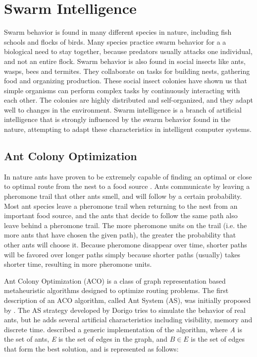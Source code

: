 \section{Swarm Intelligence}

Swarm behavior is found in many different species in nature, including fish schools and flocks of birds. Many species practice swarm behavior for a a biological need to stay together, because predators usually attacks one individual, and not an entire flock. Swarm behavior is also found in social insects like ants, wasps, bees and termites. They collaborate on tasks for building nests, gathering food and organizing production. These social insect colonies have shown us that simple organisms can perform complex tasks by continuously interacting with each other. The colonies are highly distributed and self-organized, and they adapt well to changes in the environment. Swarm intelligence \citep{beni89} is a branch of artificial intelligence that is strongly influenced by the swarm behavior found in the nature, attempting to adapt these characteristics in intelligent computer systems.

\subsection{Ant Colony Optimization}
In nature ants have proven to be extremely capable of finding an optimal or close to optimal route from the nest to a food source \citep{deneubourg90}. Ants communicate by leaving a pheromone trail that other ants smell, and will follow by a certain probability. Most ant species leave a pheromone trail when returning to the nest from an important food source, and the ants that decide to follow the same path also leave behind a pheromone trail. The more pheromone units on the trail (i.e. the more ants that have chosen the given path), the greater the probability that other ants will choose it. Because pheromone disappear over time, shorter paths will be favored over longer paths simply because shorter paths (usually) takes shorter time, resulting in more pheromone units. 

Ant Colony Optimization (ACO) is a class of graph representation based metaheuristic algorithms designed to optimize routing problems. The first description of an ACO algorithm, called Ant System (AS), was initially proposed by \citet{dorigo96}. The AS strategy developed by Dorigo tries to simulate the behavior of real ants, but he adds several artificial characteristics including visibility, memory and discrete time. \citet{nanda11} described a generic implementation of the algorithm, where \textit{A} is the set of ants, \textit{E} is the set of edges in the graph, and $B \in E$ is the set of edges that form the best solution, and is represented as follows: \\

